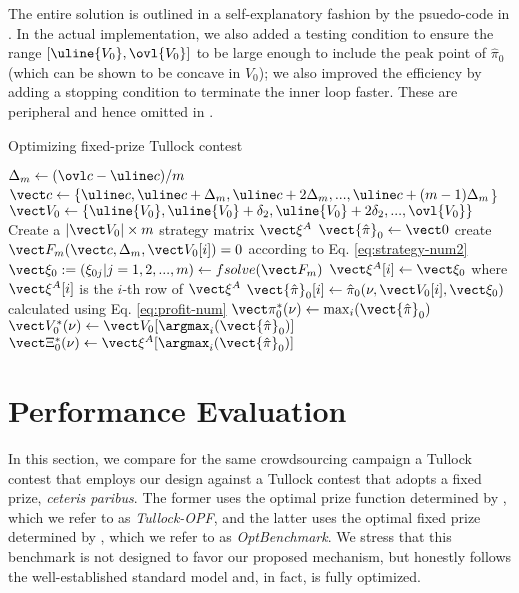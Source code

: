\documentclass{sig-alternate-10pt}
\begin{document}
The entire solution is outlined in a self-explanatory fashion by the psuedo-code in . In the actual implementation, we also added a testing condition to ensure the range $[\uline{V_0},\ovl{V_0}]$ to be large enough to include the peak point of $\hat\pi_0$ (which can be shown to be concave in $V_0$); we also improved the efficiency by adding a stopping condition to terminate the inner loop faster. These are peripheral and hence omitted in .
\begin{algorithm}
\caption{Optimizing fixed-prize Tullock contest}\label{alg:opt-fixed}
$\Delta_m \gets (\ovl c - \uline c)/m$\;
$\vect c \gets \{\uline c, \uline c+\Delta_m, \uline c+2\Delta_m,..., \uline c+(m-1)\Delta_m$\}\;
$\vect V_0 \gets \{\uline{V_0},\uline{V_0}+\delta_2,\uline{V_0}+2\delta_2,...,\ovl{V_0}\}$\;
Create a $|\vect V_0| \times m$ strategy matrix $\vect\xi^A$\;
  {
	$\vect{\hat\pi}_0 \gets \vect 0$\;
	 {
		create $\vect F_m(\vect c,\Delta_m,\vect V_0[i])=0$ according to Eq. \eqref{eq:strategy-num2}\;
		$\vect\xi_0:=(\xi_{0j}|j=1,2,...,m) \gets fsolve(\vect F_m)$\;\label{line:xi}
		$\vect\xi^A[i]\gets \vect\xi_0$ where $\vect\xi^A[i]$ is the $i$-th row of $\vect\xi^A$\;
		$\vect{\hat\pi}_0[i]\gets \hat\pi_0(\nu,\vect V_0[i],\vect\xi_0)$ calculated using Eq. \eqref{eq:profit-num}\;
	}
	$\vect\pi_0^*(\nu)\gets \max_i(\vect{\hat\pi}_0)$\;
	$\vect V_0^*(\nu)\gets \vect V_0[\argmax_i(\vect{\hat\pi}_0)]$\;\label{line:found}
	$\vect\Xi_0^*(\nu)\gets \vect\xi^A[\argmax_i(\vect{\hat\pi}_0)]$\;
}
\end{algorithm}

\section{Performance Evaluation}\label{sec:numeric}

In this section, we compare for the same crowdsourcing campaign a Tullock contest that employs our design against a Tullock contest that adopts a fixed prize, {\it ceteris paribus}.  The former uses the optimal prize function determined by , which we refer to as {\it Tullock-OPF}, and the latter uses the optimal fixed prize determined by , which we refer to as {\it OptBenchmark}. We stress that this benchmark is not designed to favor our proposed mechanism, but honestly follows the well-established standard model and, in fact, is fully optimized.
\end{document}
